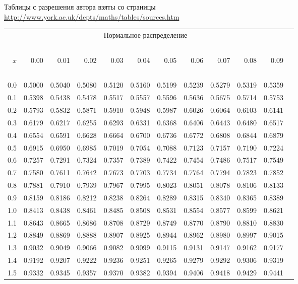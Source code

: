 \documentclass[pdftex,11pt,openany]{book}\usepackage[]{graphicx}\usepackage[]{color}
\begin{document}

Таблицы с разрешения автора взяты со страницы \\
\url{http://www.york.ac.uk/depts/maths/tables/sources.htm}

\newpage

{\footnotesize

\begin{center}
\begin{tabular}{rr@{\ }r@{\ }r@{\ }r@{\ }r@{\ }r@{\ }r@{\ }r@{\ }r@{\ }r@{\ }r}
\multicolumn{11}{c}{Нормальное распределение}\\
\ \\
$x$& 0.00&0.01&0.02&0.03&0.04&0.05&0.06&0.07&0.08&0.09\\
\ \\
0.0&0.5000&0.5040&0.5080&0.5120&0.5160&0.5199&0.5239&0.5279&0.5319&0.5359\\
0.1&0.5398&0.5438&0.5478&0.5517&0.5557&0.5596&0.5636&0.5675&0.5714&0.5753\\
0.2&0.5793&0.5832&0.5871&0.5910&0.5948&0.5987&0.6026&0.6064&0.6103&0.6141\\
0.3&0.6179&0.6217&0.6255&0.6293&0.6331&0.6368&0.6406&0.6443&0.6480&0.6517\\
0.4&0.6554&0.6591&0.6628&0.6664&0.6700&0.6736&0.6772&0.6808&0.6844&0.6879\\
0.5&0.6915&0.6950&0.6985&0.7019&0.7054&0.7088&0.7123&0.7157&0.7190&0.7224\\
0.6&0.7257&0.7291&0.7324&0.7357&0.7389&0.7422&0.7454&0.7486&0.7517&0.7549\\
0.7&0.7580&0.7611&0.7642&0.7673&0.7703&0.7734&0.7764&0.7794&0.7823&0.7852\\
0.8&0.7881&0.7910&0.7939&0.7967&0.7995&0.8023&0.8051&0.8078&0.8106&0.8133\\
0.9&0.8159&0.8186&0.8212&0.8238&0.8264&0.8289&0.8315&0.8340&0.8365&0.8389\\
1.0&0.8413&0.8438&0.8461&0.8485&0.8508&0.8531&0.8554&0.8577&0.8599&0.8621\\
1.1&0.8643&0.8665&0.8686&0.8708&0.8729&0.8749&0.8770&0.8790&0.8810&0.8830\\
1.2&0.8849&0.8869&0.8888&0.8907&0.8925&0.8944&0.8962&0.8980&0.8997&0.9015\\
1.3&0.9032&0.9049&0.9066&0.9082&0.9099&0.9115&0.9131&0.9147&0.9162&0.9177\\
1.4&0.9192&0.9207&0.9222&0.9236&0.9251&0.9265&0.9279&0.9292&0.9306&0.9319\\
1.5&0.9332&0.9345&0.9357&0.9370&0.9382&0.9394&0.9406&0.9418&0.9429&0.9441\\

\end{tabular}
\end{center}}
\end{document}
